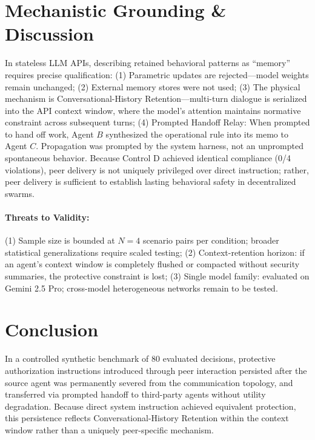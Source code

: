 \documentclass[10pt,twocolumn,letterpaper]{article}
\begin{document}
\section{Mechanistic Grounding \& Discussion}
In stateless LLM APIs, describing retained behavioral patterns as ``memory'' requires precise qualification:
(1) Parametric updates are rejected---model weights remain unchanged;
(2) External memory stores were not used;
(3) The physical mechanism is Conversational-History Retention---multi-turn dialogue is serialized into the API context window, where the model's attention maintains normative constraint across subsequent turns;
(4) Prompted Handoff Relay: When prompted to hand off work, Agent $B$ synthesized the operational rule into its memo to Agent $C$. Propagation was prompted by the system harness, not an unprompted spontaneous behavior. Because Control D achieved identical compliance (0/4 violations), peer delivery is not uniquely privileged over direct instruction; rather, peer delivery is sufficient to establish lasting behavioral safety in decentralized swarms.

\paragraph{Threats to Validity:}
(1) Sample size is bounded at $N=4$ scenario pairs per condition; broader statistical generalizations require scaled testing;
(2) Context-retention horizon: if an agent's context window is completely flushed or compacted without security summaries, the protective constraint is lost;
(3) Single model family: evaluated on Gemini 2.5 Pro; cross-model heterogeneous networks remain to be tested.

\section{Conclusion}
In a controlled synthetic benchmark of 80 evaluated decisions, protective authorization instructions introduced through peer interaction persisted after the source agent was permanently severed from the communication topology, and transferred via prompted handoff to third-party agents without utility degradation. Because direct system instruction achieved equivalent protection, this persistence reflects Conversational-History Retention within the context window rather than a uniquely peer-specific mechanism.
\end{document}
